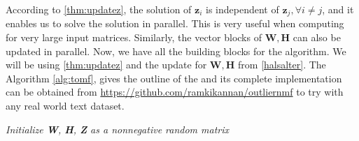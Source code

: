 According to \ref{thm:updatez}, the solution of $\mathbf{z}_i$ is independent of
$\mathbf{z}_j, \forall i \neq j $,  and it enables us to solve the
solution in parallel. This is very useful when computing for very
large input matrices. Similarly, the vector blocks of $\mathbf{W, H}$
can also be updated in parallel. Now, we have all the building
blocks for the {\algofull}  algorithm. We will be using
\ref{thm:updatez} and the update for $\mathbf{W,H}$ from
\eqref{halsalter}. The Algorithm \ref{alg:tomf}, gives the outline
of the \algo and its complete implementation can be obtained 
from \url{https://github.com/ramkikannan/outliernmf} to try with
any real world text dataset. 

\begin{algorithm}
  \BlankLine
  \textit{Initialize \textbf{W}, \textbf{H}, \textbf{Z} as a nonnegative random matrix} \;
   {
}
\caption{\algofull\ (\algo)}\label{alg:tomf}
\end{algorithm}


